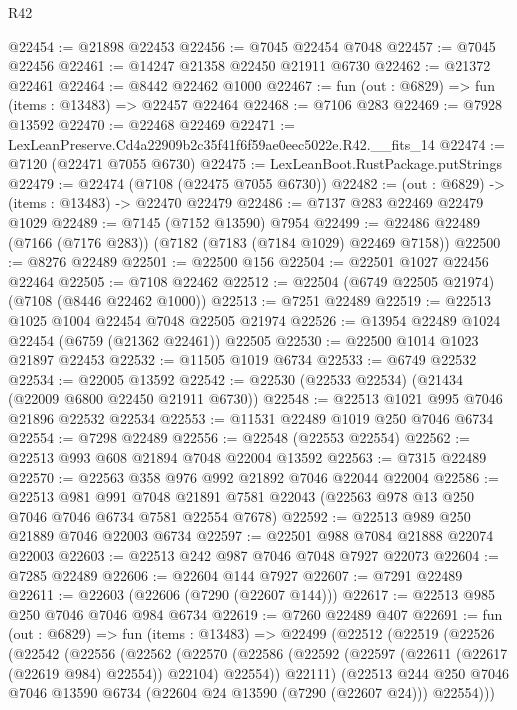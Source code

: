 \begin{lexlean}{R42}
\begin{coremodule}
{@22454 := @21898 @22453
@22456 := @7045 @22454 @7048
@22457 := @7045 @22456
@22461 := @14247 @21358 @22450 @21911 @6730
@22462 := @21372 @22461
@22464 := @8442 @22462 @1000
@22467 := fun (out : @6829) => fun (items : @13483) => @22457 @22464
@22468 := @7106 @283
@22469 := @7928 @13592
@22470 := @22468 @22469
@22471 := LexLeanPreserve.Cd4a22909b2c35f41f6f59ae0eec5022e.R42.__fits_14
@22474 := @7120 (@22471 @7055 @6730)
@22475 := LexLeanBoot.RustPackage.putStrings
@22479 := @22474 (@7108 (@22475 @7055 @6730))
@22482 := (out : @6829) -> (items : @13483) -> @22470 @22479
@22486 := @7137 @283 @22469 @22479 @1029
@22489 := @7145 (@7152 @13590) @7954
@22499 := @22486 @22489 (@7166 (@7176 @283)) (@7182 (@7183 (@7184 @1029) @22469 @7158))
@22500 := @8276 @22489
@22501 := @22500 @156
@22504 := @22501 @1027 @22456 @22464
@22505 := @7108 @22462
@22512 := @22504 (@6749 @22505 @21974) (@7108 (@8446 @22462 @1000))
@22513 := @7251 @22489
@22519 := @22513 @1025 @1004 @22454 @7048 @22505 @21974
@22526 := @13954 @22489 @1024 @22454 (@6759 (@21362 @22461)) @22505
@22530 := @22500 @1014 @1023 @21897 @22453
@22532 := @11505 @1019 @6734
@22533 := @6749 @22532
@22534 := @22005 @13592
@22542 := @22530 (@22533 @22534) (@21434 (@22009 @6800 @22450 @21911 @6730))
@22548 := @22513 @1021 @995 @7046 @21896 @22532 @22534
@22553 := @11531 @22489 @1019 @250 @7046 @6734
@22554 := @7298 @22489
@22556 := @22548 (@22553 @22554)
@22562 := @22513 @993 @608 @21894 @7048 @22004 @13592
@22563 := @7315 @22489
@22570 := @22563 @358 @976 @992 @21892 @7046 @22044 @22004
@22586 := @22513
    @981
    @991
    @7048
    @21891
    @7581
    @22043
    (@22563 @978 @13 @250 @7046 @7046 @6734 @7581 @22554 @7678)
@22592 := @22513 @989 @250 @21889 @7046 @22003 @6734
@22597 := @22501 @988 @7084 @21888 @22074 @22003
@22603 := @22513 @242 @987 @7046 @7048 @7927 @22073
@22604 := @7285 @22489
@22606 := @22604 @144 @7927
@22607 := @7291 @22489
@22611 := @22603 (@22606 (@7290 (@22607 @144)))
@22617 := @22513 @985 @250 @7046 @7046 @984 @6734
@22619 := @7260 @22489 @407
@22691 := fun (out : @6829) =>
  fun (items : @13483) =>
  @22499
    (@22512
      (@22519
        (@22526
          (@22542
            (@22556
              (@22562
                (@22570
                  (@22586 (@22592 (@22597 (@22611 (@22617 (@22619 @984) @22554)) @22104) @22554))
                  @22111)
                (@22513
                  @244
                  @250
                  @7046
                  @7046
                  @13590
                  @6734
                  (@22604 @24 @13590 (@7290 (@22607 @24)))
                  @22554)))
}
\end{coremodule}
\end{lexlean}
